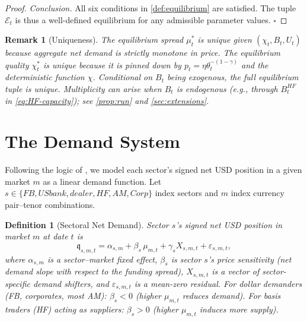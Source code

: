 \documentclass[12pt]{article}
\newtheorem{definition}{Definition}
\newtheorem{remark}{Remark}
\theoremstyle{definition}
\newcommand{\1}[1]{\mathds{1}\left[#1\right]}
\begin{document}
\begin{proof}
  \textit{Conclusion.} All six conditions in \cref{def:equilibrium} are
  satisfied. The tuple $\mathcal{E}_t$ is thus a well-defined equilibrium for
  any admissible parameter values.
  \hfill$\square$
\end{proof}

\begin{remark}[Uniqueness]
  The equilibrium spread $\mu_t^*$ is unique given $(\chi_t, B_t, U_t)$ because
  aggregate net demand is strictly monotone in price. The equilibrium quality
  $\chi_t^*$ is unique because it is pinned down by $p_t = \eta\theta_t^{-(1-\gamma)}$
  and the deterministic function $\chi$. Conditional on $B_t$ being exogenous,
  the full equilibrium tuple is unique. Multiplicity can arise when $B_t$ is
  endogenous (e.g., through $B_t^{HF}$ in \eqref{eq:HF-capacity}); see
  \cref{prop:run} and \cref{sec:extensions}.
\end{remark}

\section{The Demand System}
\label{sec:demand-system}

Following the logic of \citet{KoijenYogo2019}, we model each sector's signed
net USD position in a given market $m$ as a linear demand function. Let
$s \in \{FB, USbank, dealer, HF, AM, Corp\}$ index sectors and $m$ index
currency pair--tenor combinations.

\begin{definition}[Sectoral Net Demand]
  \label{def:net-demand}
  Sector $s$'s signed net USD position in market $m$ at date $t$ is
  \begin{equation}
    \mathfrak{q}_{s,m,t} = \alpha_{s,m} + \beta_s\,\mu_{m,t} +
    \gamma_s X_{s,m,t} + \varepsilon_{s,m,t},
    \label{eq:net-demand}
  \end{equation}
  where $\alpha_{s,m}$ is a sector--market fixed effect, $\beta_s$ is sector
  $s$'s price sensitivity (net demand slope with respect to the funding spread),
  $X_{s,m,t}$ is a vector of sector-specific demand shifters, and
  $\varepsilon_{s,m,t}$ is a mean-zero residual. For dollar demanders (FB,
  corporates, most AM): $\beta_s < 0$ (higher $\mu_{m,t}$ reduces demand). For
  basis traders (HF) acting as suppliers: $\beta_s > 0$ (higher $\mu_{m,t}$
  induces more supply).
\end{definition}
\end{document}
